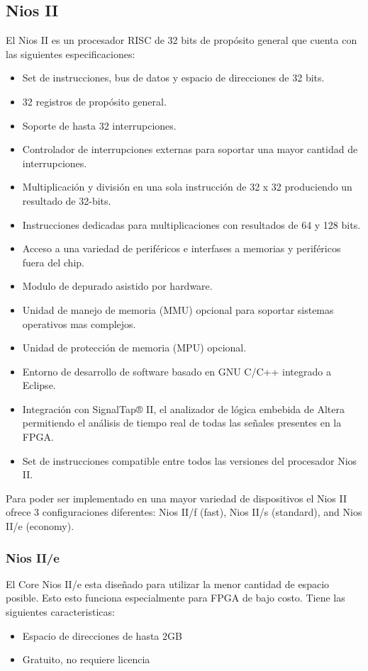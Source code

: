 \subsection{Nios II}
El Nios II es un procesador RISC de 32 bits de propósito general que cuenta con las siguientes especificaciones:
\begin{itemize}
	\item Set de instrucciones, bus de datos y espacio de direcciones de 32 bits.
	\item 32 registros de propósito general.
	\item Soporte de hasta 32 interrupciones.
	\item Controlador de interrupciones externas para soportar una mayor cantidad de interrupciones.
	\item Multiplicación y división en una sola instrucción de 32 x 32 produciendo un resultado de 32-bits.
	\item Instrucciones dedicadas para multiplicaciones con resultados de 64 y 128 bits.
	\item Acceso a una variedad de periféricos e interfases a memorias  y periféricos fuera del chip.
	\item Modulo de depurado asistido por hardware.
	\item Unidad de manejo de memoria (MMU) opcional para soportar sistemas operativos mas complejos.
	\item Unidad de protección de memoria (MPU) opcional.
	\item Entorno de desarrollo de software basado en GNU C/C++ integrado a Eclipse.
	\item Integración con SignalTap® II, el analizador de lógica embebida de Altera permitiendo el análisis de tiempo real de todas las señales presentes en la FPGA.
	\item Set de instrucciones compatible entre todos las versiones del procesador Nios II.
\end{itemize}

Para poder ser implementado en una mayor variedad de dispositivos el Nios II ofrece 3 configuraciones diferentes:  Nios II/f (fast), Nios II/s (standard), and Nios II/e (economy).

\subsubsection{Nios II/e}
El Core Nios II/e esta diseñado para utilizar la menor cantidad de espacio posible. Esto esto funciona especialmente para FPGA de bajo costo. Tiene las siguientes caracteristicas:
\begin{itemize}
	\item Espacio de direcciones de hasta 2GB
	\item Gratuito, no requiere licencia 
\end{itemize}

